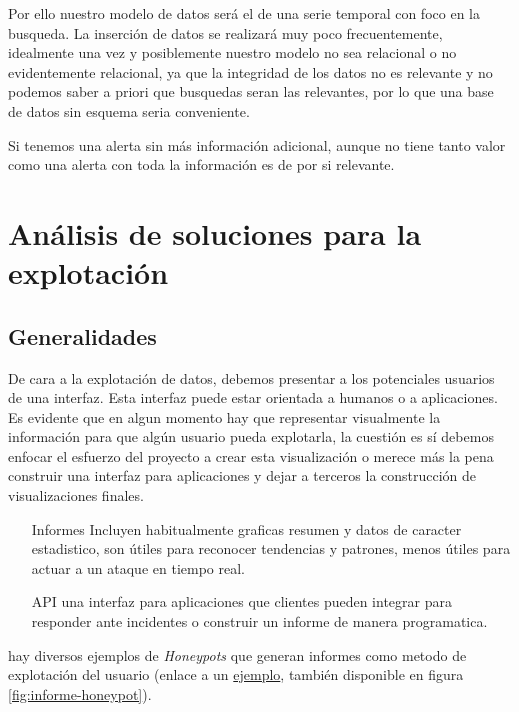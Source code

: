 Por ello nuestro modelo de datos será el de una serie temporal con foco en la busqueda. La inserción de datos se realizará muy poco frecuentemente, idealmente una vez
y posiblemente nuestro modelo no sea relacional o no evidentemente relacional, ya que la integridad de los datos no es relevante y no podemos saber a priori que busquedas
seran las relevantes, por lo que una base de datos sin esquema seria conveniente.

Si tenemos una alerta sin más información adicional, aunque no tiene tanto valor como una alerta con toda la información es de por si relevante.

\section{Análisis de soluciones para la explotación}

\subsection{Generalidades}

De cara a la explotación de datos, debemos presentar a los potenciales usuarios de una interfaz. Esta interfaz puede estar
orientada a humanos o a aplicaciones. Es evidente que en algun momento hay que representar visualmente la información para que algún usuario pueda explotarla,
la cuestión es sí debemos enfocar el esfuerzo del proyecto a crear esta visualización o merece más la pena construir
una interfaz para aplicaciones y dejar a terceros la construcción de visualizaciones finales.

\begin{enumerate}
    \item[Informes] Incluyen habitualmente graficas resumen y datos de caracter estadistico, son útiles para reconocer tendencias y patrones, menos útiles para actuar a un ataque en tiempo real.
    \item[API] una interfaz para aplicaciones que clientes pueden integrar para responder ante incidentes o construir un informe de manera programatica.
\end{enumerate}

hay diversos ejemplos de \emph{Honeypots} que generan informes como metodo de explotación del usuario (enlace a un \href{http://www.nothink.org/honeypot_ssh.php}{ejemplo}, también disponible en figura \ref{fig:informe-honeypot}).

